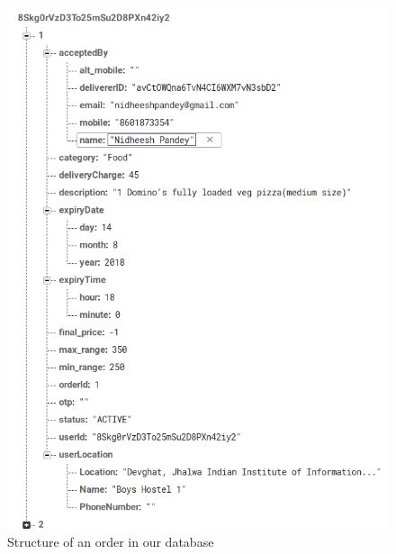 \documentclass{report}
\begin{document}
\begin{figure}[h!]
\includegraphics[width=18cm]{order.png}
\caption{Structure of an order in our database}
\label{fig:NASA_Logo}
\end{figure}






\end{document}
